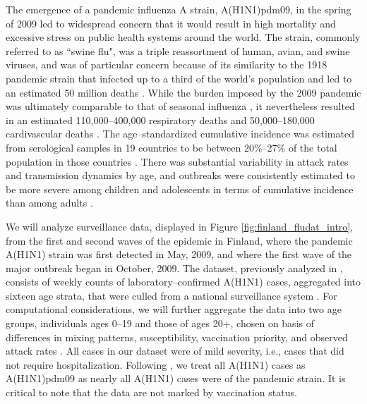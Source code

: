 The emergence of a pandemic influenza A strain, A(H1N1)pdm09, in the spring of 2009 led to widespread concern that it would result in high mortality and excessive stress on public health systems around the world. The strain, commonly referred to as ``swine flu", was a triple reassortment of human, avian, and swine viruses, and was of particular concern because of its similarity to the 1918 pandemic strain that infected up to a third of the world's population and led to an estimated 50 million deaths \cite{cdc1918pandemic}. While the burden imposed by the 2009 pandemic was ultimately comparable to that of seasonal influenza \cite{iuliano2018estimates}, it nevertheless resulted in an estimated 110,000--400,000 respiratory deaths and 50,000--180,000 cardivascular deaths \cite{dawood2012estimated}. The age--standardized cumulative incidence was estimated from serological samples in 19 countries to be between 20\%--27\% of the total population in those countries \cite{van2013estimating}. There was substantial variability in attack rates and transmission dynamics by age, and outbreaks were consistently estimated to be more severe among children and adolescents in terms of cumulative incidence than among adults \cite{opatowski2011transmission,steens2011age,van2013estimating,yang2015inference}. 

We will analyze surveillance data, displayed in Figure \ref{fig:finland_fludat_intro}, from the first and second waves of the epidemic in Finland, where the pandemic A(H1N1) strain was first detected in May, 2009, and where the first wave of the major outbreak began in October, 2009. The dataset, previously analyzed in \cite{shubin2016revealing,shubin2014estimating}, consists of weekly counts of laboratory--confirmed A(H1N1) cases, aggregated into sixteen age strata, that were culled from a national surveillance system \cite{lyytikainen2011surveillance}. For computational considerations, we will further aggregate the data into two age groups, individuals ages 0--19 and those of ages 20+, chosen on basis of differences in mixing patterns, susceptibility, vaccination priority, and observed attack rates \cite{kelly2011age,opatowski2011transmission,steens2011age}. All cases in our dataset were of mild severity, i.e., cases that did not require hospitalization. Following \cite{shubin2016revealing,shubin2014estimating}, we treat all A(H1N1) cases as A(H1N1)pdm09 as nearly all A(H1N1) cases were of the pandemic strain. It is critical to note that the data are not marked by vaccination status.

